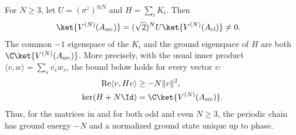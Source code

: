 \begin{lemma}\label{thm:cluster_source_periodic_ground_state}
    \leanok
    For $N\ge3$, let
    $U=(\sigma^z)^{\otimes N}$ and $H=\sum_i K_i$. Then
    \begin{align}
        \ket{V^{(N)}(A_{\mathrm{src}})}
         & =(\sqrt2)^N U\ket{V^{(N)}(A_{\mathrm{cl}})}\ne0.
        \label{eq:cluster_source_vector}
    \end{align}
    The common $-1$ eigenspace of the $K_i$ and the ground eigenspace of $H$
    are both $\C\ket{V^{(N)}(A_{\mathrm{src}})}$. More precisely, with the
    usual inner product $\langle v,w\rangle=\sum_s\overline{v_s}w_s$, the
    bound below holds for every vector $v$:
    \begin{align}
        \operatorname{Re}\langle v,Hv\rangle & \ge-N\|v\|^2,\notag                       \\
        \ker(H+N\Id)                         & =\C\ket{V^{(N)}(A_{\mathrm{src}})}.\notag
    \end{align}
    Thus, for the matrices in \cite{PerezGarcia2007Matrix} and for both odd
    and even $N\ge3$, the periodic chain has ground energy $-N$ and a
    normalized ground state unique up to phase.
\end{lemma}

